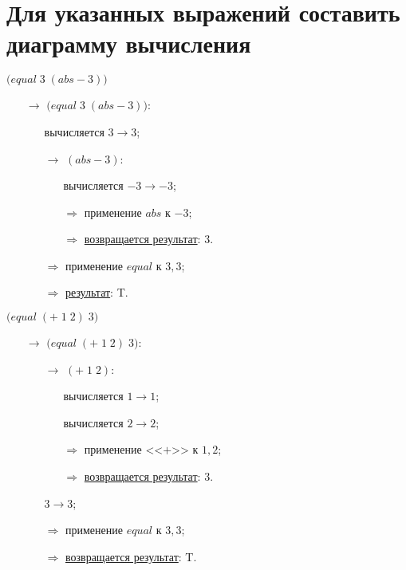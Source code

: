 
\section{Для указанных выражений составить диаграмму вычисления}

\vfill
\problem $\bigl(equal\; 3\; (abs -\!3)\bigr)$

\begin{itemize}
	\item[$\longrightarrow$]$\bigl(equal\; 3\; (abs -\!3)\bigr)$:
	\begin{itemize}
		\item[\textbullet] вычисляется $3 \to 3$;
		\item[$\longrightarrow$] $(abs -\!3)$:
		\begin{itemize}
			\item[\textbullet] вычисляется $-3 \to -3$;
			\item[$\Longrightarrow$] применение $abs$ к $-3$;
			\item[$\Longrightarrow$] \underline{возвращается результат}: $3$.
		\end{itemize}
		\item[$\Longrightarrow$] применение $equal$ к $3, 3$;
		\item[$\Longrightarrow$] \underline{результат}: T.
	\end{itemize}
\end{itemize}
\vfill


\problem $\bigl(equal\; (+\; 1\; 2)\; 3\bigr)$

\begin{itemize}
	\item[$\longrightarrow$] $\bigl(equal\; (+\; 1\; 2)\; 3\bigr)$:
	\begin{itemize}
		\item[$\longrightarrow$] $(+\; 1\; 2)$:
		\begin{itemize}
			\item[\textbullet] вычисляется $1 \to 1$;
			\item[\textbullet] вычисляется $2 \to 2$;
			\item[$\Longrightarrow$] применение <<$+$>> к $1, 2$;
			\item[$\Longrightarrow$] \underline{возвращается результат}: $3$.
		\end{itemize}
		\item[\textbullet] $3 \to 3$;
		\item[$\Longrightarrow$] применение $equal$ к $3, 3$;
		\item[$\Longrightarrow$] \underline{возвращается результат}: T.
	\end{itemize}
\end{itemize}
\vfill



